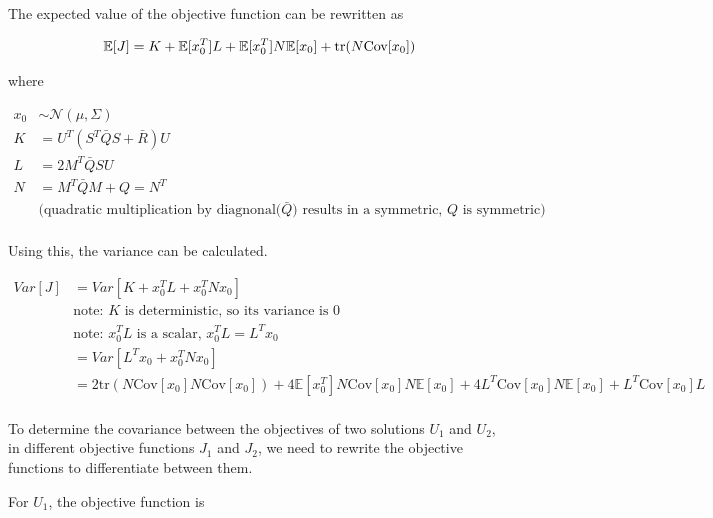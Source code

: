 \documentclass{article}
\begin{document}

The expected value of the objective function can be rewritten as

$$
\mathbb{E}[J] = K + \mathbb{E}[x_0^T] L + \mathbb{E}[x_0^T] N \mathbb{E}[x_0] + \text{tr}(N \text{Cov}[x_0]) \\
$$

where

$$
\begin{aligned}
  x_0 &\sim \mathcal{N}(\mu, \Sigma) \\
  K &= U^T(S^T \bar{Q} S + \bar{R}) U \\
  L &= 2 M^T \bar{Q} S U \\
  N &= M^T \bar{Q} M + Q = N^T \\
  &\text{(quadratic multiplication by diagnonal($\bar{Q}$) results in a symmetric, $Q$ is symmetric)} \\
\end{aligned}
$$

Using this, the variance can be calculated.

\begin{equation}
  \begin{aligned}
    Var[J] &= Var[K + x_0^T L + x_0^T N x_0] \\
    &\text{note: $K$ is deterministic, so its variance is 0} \\
    & \text{note: $x_0^T L$ is a scalar, $x_0^T L = L^T x_0$} \\
    &= Var[L^T x_0 + x_0^T N x_0] \\
    &= 2\text{tr}(N \text{Cov}[x_0] N \text{Cov}[x_0]) + 4 \mathbb{E}[x_0^T]N\text{Cov}[x_0]N\mathbb{E}[x_0] + 4 L^T \text{Cov}[x_0] N \mathbb{E}[x_0] + L^T \text{Cov}[x_0] L \\
  \end{aligned}
\end{equation}

To determine the covariance between the objectives of two solutions $U_1$ and $U_2$, in different objective functions
$J_1$ and $J_2$, we need to rewrite the objective functions to differentiate between them.

For $U_1$, the objective function is
\end{document}
